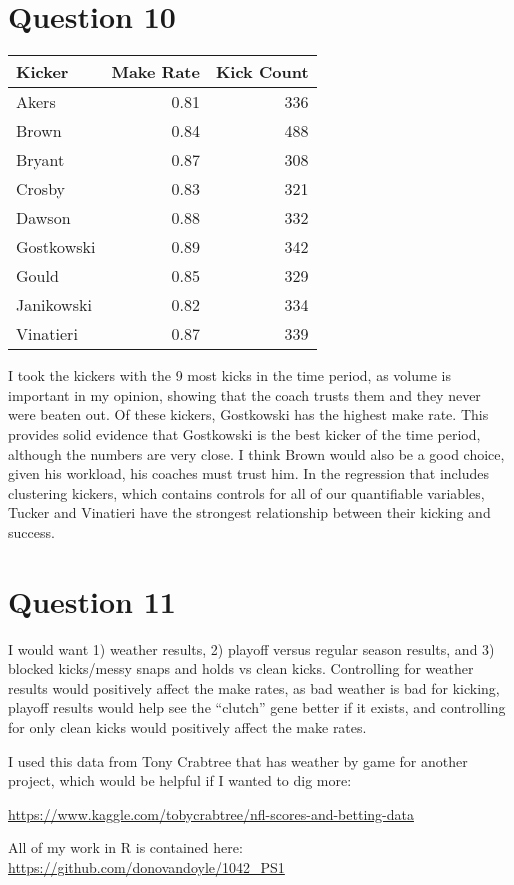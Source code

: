 \documentclass[]{article}
\begin{document}
\section{Question 10}\label{question-10}

\begin{table}[H]
\centering
\begin{tabular}{l|r|r}
\hline
Kicker & Make Rate & Kick Count\\
\hline
Akers & 0.81 & 336\\
\hline
Brown & 0.84 & 488\\
\hline
Bryant & 0.87 & 308\\
\hline
Crosby & 0.83 & 321\\
\hline
Dawson & 0.88 & 332\\
\hline
Gostkowski & 0.89 & 342\\
\hline
Gould & 0.85 & 329\\
\hline
Janikowski & 0.82 & 334\\
\hline
Vinatieri & 0.87 & 339\\
\hline
\end{tabular}
\end{table}

I took the kickers with the 9 most kicks in the time period, as volume
is important in my opinion, showing that the coach trusts them and they
never were beaten out. Of these kickers, Gostkowski has the highest make
rate. This provides solid evidence that Gostkowski is the best kicker of
the time period, although the numbers are very close. I think Brown
would also be a good choice, given his workload, his coaches must trust
him. In the regression that includes clustering kickers, which contains
controls for all of our quantifiable variables, Tucker and Vinatieri
have the strongest relationship between their kicking and success.

\section{Question 11}\label{question-11}

I would want 1) weather results, 2) playoff versus regular season
results, and 3) blocked kicks/messy snaps and holds vs clean kicks.
Controlling for weather results would positively affect the make rates,
as bad weather is bad for kicking, playoff results would help see the
``clutch'' gene better if it exists, and controlling for only clean
kicks would positively affect the make rates.

I used this data from Tony Crabtree that has weather by game for another
project, which would be helpful if I wanted to dig more:

\url{https://www.kaggle.com/tobycrabtree/nfl-scores-and-betting-data}

All of my work in R is contained here:
\url{https://github.com/donovandoyle/1042_PS1}
\end{document}
